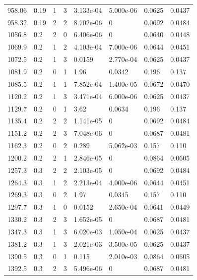 \documentclass[preview]{standalone}
\begin{document}
{{{\begin{tabular}{L{1.2cm}C{1.2cm} C{0.3cm}C{0.5cm} C{1.4cm}C{1.4cm} C{1.4cm}C{1.4cm}}
  958.06  &  0.19  & 1     &  3 &  3.133e-04  & 5.000e-06  & 0.0625 &  0.0437   \\ 
  958.32  &  0.19  & 2     &  2 &  8.702e-06  & 0  & 0.0692 &  0.0484   \\ 
  1056.8  &   0.2  & 2     &  0 &  6.406e-06  & 0  & 0.0640 &  0.0448   \\ 
  1069.9  &   0.2  & 1     &  2 &  4.103e-04  & 7.000e-06  & 0.0644 &  0.0451   \\ 
  1072.5  &   0.2  & 1     &  3 &  0.0159  & 2.770e-04  & 0.0625 &  0.0437   \\ 
  1081.9  &   0.2  & 0     &  1 &  1.96  & 0.0342  & 0.196 &  0.137   \\ 
  1085.5  &   0.2  & 1     &  1 &  7.852e-04  & 1.400e-05  & 0.0672 &  0.0470   \\ 
  1120.2  &   0.2  & 1     &  3 &  3.471e-04  & 6.000e-06  & 0.0625 &  0.0437   \\ 
  1129.7  &   0.2  & 0     &  1 &  3.62  & 0.0634  & 0.196 &  0.137   \\ 
  1135.4  &   0.2  & 2     &  2 &  1.141e-05  & 0  & 0.0692 &  0.0484   \\ 
  1151.2  &   0.2  & 2     &  3 &  7.048e-06  & 0  & 0.0687 &  0.0481   \\ 
  1162.3  &   0.2  & 0     &  2 &  0.289  & 5.062e-03  & 0.157 &  0.110   \\ 
  1200.2  &   0.2  & 2     &  1 &  2.846e-05  & 0  & 0.0864 &  0.0605   \\ 
  1257.3  &   0.3  & 2     &  2 &  2.103e-05  & 0  & 0.0692 &  0.0484   \\ 
  1264.3  &   0.3  & 1     &  2 &  2.213e-04  & 4.000e-06  & 0.0644 &  0.0451   \\ 
  1269.3  &   0.3  & 0     &  2 &  1.97  & 0.0345  & 0.157 &  0.110   \\ 
  1297.7  &   0.3  & 1     &  0 &  0.0152  & 2.650e-04  & 0.0641 &  0.0449   \\ 
  1330.2  &   0.3  & 2     &  3 &  1.652e-05  & 0  & 0.0687 &  0.0481   \\ 
  1347.3  &   0.3  & 1     &  3 &  6.020e-03  & 1.050e-04  & 0.0625 &  0.0437   \\ 
  1381.2  &   0.3  & 1     &  3 &  2.021e-03  & 3.500e-05  & 0.0625 &  0.0437   \\ 
  1390.5  &   0.3  & 0     &  1 &  0.115  & 2.010e-03  & 0.0864 &  0.0605   \\ 
  1392.5  &   0.3  & 2     &  3 &  5.496e-06  & 0  & 0.0687 &  0.0481   \\ 

\end{tabular}}}}
\end{document}
